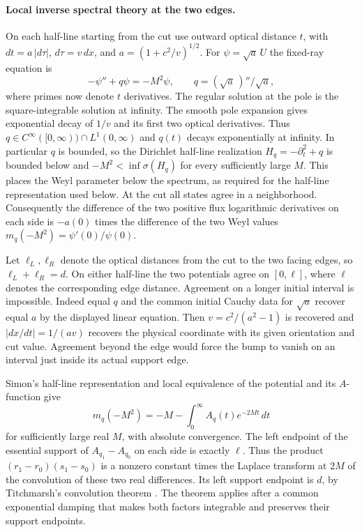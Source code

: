 \documentclass[11pt,letterpaper]{article}
\begin{document}
\paragraph{Local inverse spectral theory at the two edges.}
On each half-line starting from the cut use outward optical distance
\(t\), with \(dt=a\,|d\tau|\), \(d\tau=v\,dx\), and
\(a=(1+c^2/v)^{1/2}\). For \(\psi=\sqrt a\,U\) the fixed-ray equation
is
\[
 -\psi''+q\psi=-M^2\psi,\qquad q=(\sqrt a\,)''/\sqrt a ,
\]
where primes now denote \(t\) derivatives. The regular solution at the
pole is the square-integrable solution at infinity. The smooth pole
expansion gives exponential decay of \(1/v\) and its first two
optical derivatives. Thus \(q\in C^\infty([0,\infty))\cap L^1(0,\infty)\)
and \(q(t)\) decays exponentially at infinity. In particular \(q\) is
bounded, so the Dirichlet half-line realization
\(H_q=-\partial_t^2+q\) is bounded below and
\(-M^2<\inf\sigma(H_q)\) for every sufficiently large \(M\). This
places the Weyl parameter below the spectrum, as required for the
half-line representation used below. At the cut all
states agree in a neighborhood. Consequently the difference of
the two positive flux logarithmic derivatives on each side is
\(-a(0)\) times the difference of the two Weyl values
\(m_q(-M^2)=\psi'(0)/\psi(0)\).

Let \(\ell_L,\ell_R\) denote the optical distances from the cut to
the two facing edges, so \(\ell_L+\ell_R=d\).
On either half-line the two potentials agree on \([0,\ell]\), where
\(\ell\) denotes the corresponding edge distance. Agreement on a
longer initial interval is impossible. Indeed equal \(q\) and the
common initial Cauchy data for \(\sqrt a\) recover equal \(a\) by
the displayed linear equation. Then \(v=c^2/(a^2-1)\) is recovered
and \(|dx/dt|=1/(av)\) recovers the physical coordinate with its
given orientation and cut value. Agreement beyond the edge would
force the bump to vanish on an interval just inside its actual
support edge.

Simon's half-line representation and local equivalence of the potential
and its \(A\)-function \cite[Theorems~1.4, 1.5 and 2.1]{simon} give
\[
 m_q(-M^2)=-M-\int_0^\infty A_q(t)e^{-2Mt}\,dt
\]
for sufficiently large real \(M\), with absolute convergence.
The left endpoint of the essential support of
\(A_{q_1}-A_{q_0}\) on each side is exactly \(\ell\).
Thus the product \((r_1-r_0)(s_1-s_0)\) is a nonzero constant times
the Laplace transform at \(2M\) of the convolution of these two
real differences. Its left support endpoint is \(d\), by Titchmarsh's
convolution theorem \cite{titchmarsh}.
The theorem applies after a common exponential damping that makes
both factors integrable and preserves their support endpoints.
\end{document}
